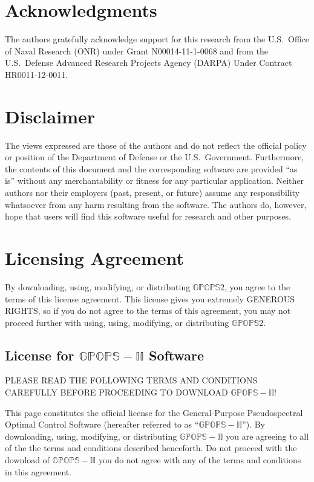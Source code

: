 \documentclass[10pt]{article}
\begin{document}
\section*{Acknowledgments}

The authors gratefully acknowledge support for this research from the 
U.S.~Office of Naval Research (ONR) under Grant N00014-11-1-0068 and 
from the U.S.~Defense Advanced Research Projects Agency (DARPA) Under 
Contract HR0011-12-0011.

\section*{Disclaimer}

The views expressed are those of the authors and do not reflect the
official policy or position of the Department of Defense or the
U.S.~Government.   Furthermore, the contents of this document and the 
corresponding software are provided ``as is'' without any
merchantability or fitness for any particular application.  Neither
authors nor their employers (past, present, or future) assume any
responsibility whatsoever from any harm resulting from the
software. The authors do, however, hope that users will find this
software useful for research and other purposes.   

\section*{Licensing Agreement}

By downloading, using, modifying, or distributing $\mathbb{GPOPS}2$,
you agree to the terms of this license agreement.  This license gives
you extremely GENEROUS RIGHTS, so if you do not agree to the terms of
this agreement, you may not proceed further with using, using,
modifying, or distributing $\mathbb{GPOPS}2$.  

\subsection*{License for $\mathbb{GPOPS-II}$ Software}

PLEASE READ THE FOLLOWING TERMS AND CONDITIONS CAREFULLY BEFORE
PROCEEDING TO DOWNLOAD $\mathbb{GPOPS-II}$!

This page constitutes the official license for the General-Purpose
Pseudospectral Optimal Control Software (hereafter referred to as
“$\mathbb{GPOPS-II}$”).  By downloading, using, modifying, or distributing
$\mathbb{GPOPS-II}$ you are agreeing to all of the the terms and
conditions described henceforth.  Do not proceed with the download of
$\mathbb{GPOPS-II}$ you do not agree with any of the terms and
conditions in this  agreement.   
\end{document}
